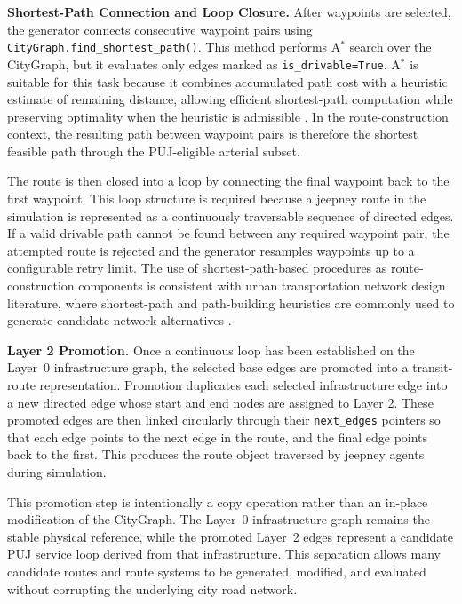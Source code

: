 {\textbf{Shortest-Path Connection and Loop Closure.}
After waypoints are selected, the generator connects consecutive waypoint pairs using \texttt{CityGraph.find\_shortest\_path()}. This method performs A$^\ast$ search over the CityGraph, but it evaluates only edges marked as \texttt{is\_drivable=True}. A$^\ast$ is suitable for this task because it combines accumulated path cost with a heuristic estimate of remaining distance, allowing efficient shortest-path computation while preserving optimality when the heuristic is admissible \citep{hart1968}. In the route-construction context, the resulting path between waypoint pairs is therefore the shortest feasible path through the \ac{PUJ}-eligible arterial subset.

The route is then closed into a loop by connecting the final waypoint back to the first waypoint. This loop structure is required because a jeepney route in the simulation is represented as a continuously traversable sequence of directed edges. If a valid drivable path cannot be found between any required waypoint pair, the attempted route is rejected and the generator resamples waypoints up to a configurable retry limit. The use of shortest-path-based procedures as route-construction components is consistent with urban transportation network design literature, where shortest-path and path-building heuristics are commonly used to generate candidate network alternatives \cite{farahani2013review}.

\textbf{Layer 2 Promotion.}
Once a continuous loop has been established on the Layer~0 infrastructure graph, the selected base edges are promoted into a transit-route representation. Promotion duplicates each selected infrastructure edge into a new directed edge whose start and end nodes are assigned to Layer 2. These promoted edges are then linked circularly through their \texttt{next\_edges} pointers so that each edge points to the next edge in the route, and the final edge points back to the first. This produces the route object traversed by jeepney agents during simulation.

This promotion step is intentionally a copy operation rather than an in-place modification of the CityGraph. The Layer~0 infrastructure graph remains the stable physical reference, while the promoted Layer~2 edges represent a candidate \ac{PUJ} service loop derived from that infrastructure. This separation allows many candidate routes and route systems to be generated, modified, and evaluated without corrupting the underlying city road network.

}
